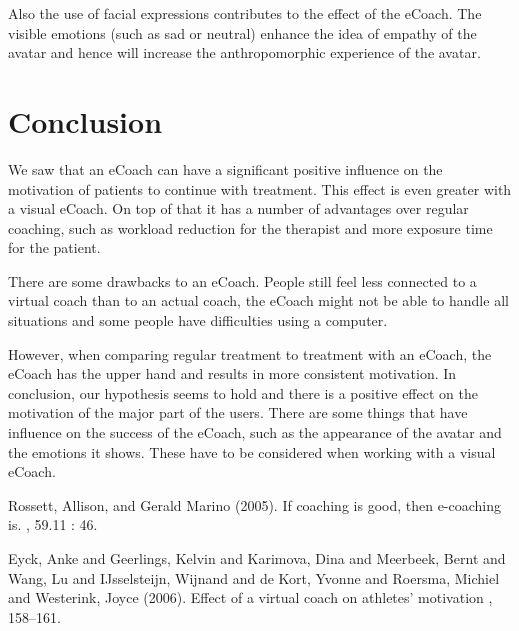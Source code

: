 \documentclass[twoside]{article}
\begin{document}
\begin{multicols}{2}
Also the use of facial expressions contributes to the effect of the eCoach. The visible emotions (such as sad or neutral) enhance the idea of empathy of the avatar \cite{blanson2009online} and hence will increase the anthropomorphic experience of the avatar.


\section{Conclusion}
We saw that an eCoach can have a significant positive influence on the motivation of patients to continue with treatment. This effect is even greater with a visual eCoach. On top of that it has a number of advantages over regular coaching, such as workload reduction for the therapist and more exposure time for the patient.

There are some drawbacks to an eCoach. People still feel less connected to a virtual coach than to an actual coach, the eCoach might not be able to handle all situations and some people have difficulties using a computer.

However, when comparing regular treatment to treatment with an eCoach, the eCoach has the upper hand and results in more consistent motivation. In conclusion, our hypothesis seems to hold and there is a positive effect on the motivation of the major part of the users. There are some things that have influence on the success of the eCoach, such as the appearance of the avatar and the emotions it shows. These have to be considered when working with a visual eCoach.


\begin{thebibliography}{99}


Rossett, Allison, and Gerald Marino (2005).
\newblock If coaching is good, then e-coaching is.
, 59.11 : 46.

Eyck, Anke and Geerlings, Kelvin and Karimova, Dina and Meerbeek, Bernt and Wang, Lu and IJsselsteijn, Wijnand and de Kort, Yvonne and Roersma, Michiel and Westerink, Joyce (2006).
\newblock Effect of a virtual coach on athletes’ motivation
, 158--161.



\end{thebibliography}
\end{multicols}
\end{document}
